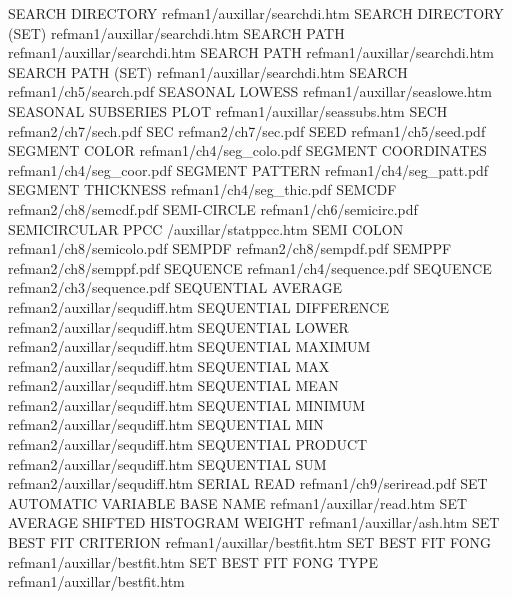 SEARCH DIRECTORY                        refman1/auxillar/searchdi.htm
SEARCH DIRECTORY (SET)                  refman1/auxillar/searchdi.htm
SEARCH PATH                             refman1/auxillar/searchdi.htm
SEARCH PATH                             refman1/auxillar/searchdi.htm
SEARCH PATH (SET)                       refman1/auxillar/searchdi.htm
SEARCH                                  refman1/ch5/search.pdf
SEASONAL LOWESS                         refman1/auxillar/seaslowe.htm
SEASONAL SUBSERIES PLOT                 refman1/auxillar/seassubs.htm
SECH                                    refman2/ch7/sech.pdf
SEC                                     refman2/ch7/sec.pdf
SEED                                    refman1/ch5/seed.pdf
SEGMENT COLOR                           refman1/ch4/seg_colo.pdf
SEGMENT COORDINATES                     refman1/ch4/seg_coor.pdf
SEGMENT PATTERN                         refman1/ch4/seg_patt.pdf
SEGMENT THICKNESS                       refman1/ch4/seg_thic.pdf
SEMCDF                                  refman2/ch8/semcdf.pdf
SEMI-CIRCLE                             refman1/ch6/semicirc.pdf
SEMICIRCULAR PPCC                       /auxillar/statppcc.htm
SEMI COLON                              refman1/ch8/semicolo.pdf
SEMPDF                                  refman2/ch8/sempdf.pdf
SEMPPF                                  refman2/ch8/semppf.pdf
SEQUENCE                                refman1/ch4/sequence.pdf
SEQUENCE                                refman2/ch3/sequence.pdf
SEQUENTIAL AVERAGE                      refman2/auxillar/sequdiff.htm
SEQUENTIAL DIFFERENCE                   refman2/auxillar/sequdiff.htm
SEQUENTIAL LOWER                        refman2/auxillar/sequdiff.htm
SEQUENTIAL MAXIMUM                      refman2/auxillar/sequdiff.htm
SEQUENTIAL MAX                          refman2/auxillar/sequdiff.htm
SEQUENTIAL MEAN                         refman2/auxillar/sequdiff.htm
SEQUENTIAL MINIMUM                      refman2/auxillar/sequdiff.htm
SEQUENTIAL MIN                          refman2/auxillar/sequdiff.htm
SEQUENTIAL PRODUCT                      refman2/auxillar/sequdiff.htm
SEQUENTIAL SUM                          refman2/auxillar/sequdiff.htm
SERIAL READ                             refman1/ch9/seriread.pdf
SET AUTOMATIC VARIABLE BASE NAME        refman1/auxillar/read.htm
SET AVERAGE SHIFTED HISTOGRAM WEIGHT    refman1/auxillar/ash.htm
SET BEST FIT CRITERION                  refman1/auxillar/bestfit.htm
SET BEST FIT FONG                       refman1/auxillar/bestfit.htm
SET BEST FIT FONG TYPE                  refman1/auxillar/bestfit.htm
